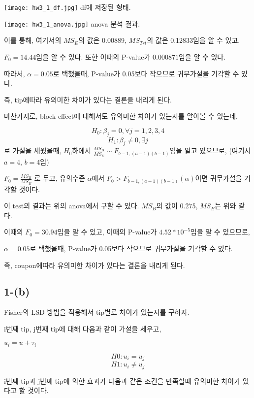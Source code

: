 \documentclass{article}
\begin{document}
\begin{center}
    \texttt{[image: hw3\_1\_df.jpg]}
df에 저장된 형태.
\end{center} 

\begin{center}
    \texttt{[image: hw3\_1\_anova.jpg]}
anova 분석 결과.
\end{center} 

이를 통해, 여기서의 $MS_E$의 값은 0.00889, $MS_{Trt}$의 값은 0.12833임을 알 수 있고,

$F_0 = 14.44$임을 알 수 있다. 또한 이때의 P-value가  $0.000871$임을 알 수 있다.

따라서, $\alpha = 0.05$로 택했을때, P-value가 0.05보다 작으므로 귀무가설을 기각할 수 있다.

즉, tip에따라 유의미한 차이가 있다는 결론을 내리게 된다.

마찬가지로, block effect에 대해서도 유의미한 차이가 있는지를 알아볼 수 있는데,

$$H_0 : \beta_j = 0 , \forall j = 1, 2, 3, 4$$ 
$$H_1 :  \beta_j \neq 0, \exists j$$
로 가설을 세웠을때, $H_0$하에서 $\frac{MS_{B}}{MS_E} \sim F_{b-1, (a-1)(b-1)} $임을 알고 있으므로,
(여기서 $a = 4$, $b = 4$임)

$F_0 = \frac{MS_{B}}{MS_E}$ 로 두고,  유의수준 $\alpha$에서 $F_0 > F_{b-1, (a-1)(b-1)}(\alpha)$이면 귀무가설을 기각할 것이다.
 
이 test의 결과는 위의 anova에서 구할 수 있다. $MS_{B}$의 값이 0.275, $MS_E$는 위와 같다.

이때의 $F_0 = 30.94$임을 알 수 있고, 이때의 P-value가 $4.52 * 10^{-5}$임을 알 수 있으므로,

$\alpha = 0.05$로 택했을때, P-value가 0.05보다 작으므로 귀무가설을 기각할 수 있다.

즉, coupon에따라 유의미한 차이가 있다는 결론을 내리게 된다. \\



\subsection{1-(b)}

Fisher의 LSD 방법을 적용해서 tip별로 차이가 있는지를 구하자.

i번째 tip, j번째 tip에 대해 다음과 같이 가설을 세우고,

$u_i = u + \tau_i$

$$H0 : u_i = u_j $$
$$H1 : u_i \neq u_j $$

i번째 tip과 j번째 tip에 의한 효과가 다음과 같은 조건을 만족할때 유의미한 차이가 있다고 할 것이다.
\end{document}
